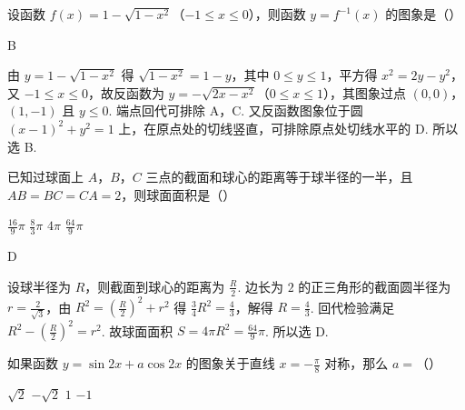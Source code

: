 \begin{problem}
设函数 \(f(x)=1-\sqrt{1-x^{2}}\)（\(-1\leqslant x\leqslant 0\)），则函数 \(y=f^{-1}(x)\) 的图象是（\quad）

{}
{}
{}
\end{problem}

\begin{answer}
B
\end{answer}

\begin{solution}
由 \(y=1-\sqrt{1-x^{2}}\) 得 \(\sqrt{1-x^{2}}=1-y\)，其中 \(0\leqslant y\leqslant 1\)，平方得 \(x^{2}=2y-y^{2}\)，又 \(-1\leqslant x\leqslant 0\)，故反函数为 \(y=-\sqrt{2x-x^{2}}\)（\(0\leqslant x\leqslant 1\)），其图象过点 \((0,0)\)，\((1,-1)\) 且 \(y\leqslant 0\). 端点回代可排除 A，C. 又反函数图象位于圆 \((x-1)^2+y^2=1\) 上，在原点处的切线竖直，可排除原点处切线水平的 D. 所以选 B.
\end{solution}

\begin{problem}
已知过球面上 \(A\)，\(B\)，\(C\) 三点的截面和球心的距离等于球半径的一半，且 \(AB=BC=CA=2\)，则球面面积是（\quad）

\choices
    {\(\frac{16}{9}\pi\)}
    {\(\frac{8}{3}\pi\)}
    {\(4\pi\)}
    {\(\frac{64}{9}\pi\)}
\end{problem}

\begin{answer}
D
\end{answer}

\begin{solution}
设球半径为 \(R\)，则截面到球心的距离为 \(\frac{R}{2}\). 边长为 \(2\) 的正三角形的截面圆半径为 \(r=\frac{2}{\sqrt{3}}\)，由 \(R^{2}=\left( \frac{R}{2} \right)^{2}+r^{2}\) 得 \(\frac{3}{4}R^{2}=\frac{4}{3}\)，解得 \(R=\frac{4}{3}\). 回代检验满足 \(R^{2}-\left( \frac{R}{2} \right)^{2}=r^{2}\). 故球面面积 \(S=4\pi R^{2}=\frac{64}{9}\pi\). 所以选 D.
\end{solution}

\begin{problem}
如果函数 \(y=\sin 2x+a\cos 2x\) 的图象关于直线 \(x=-\frac{\pi}{8}\) 对称，那么 \(a=\)（\quad）

\choices
    {\(\sqrt{2}\)}
    {\(-\sqrt{2}\)}
    {\(1\)}
    {\(-1\)}
\end{problem}

